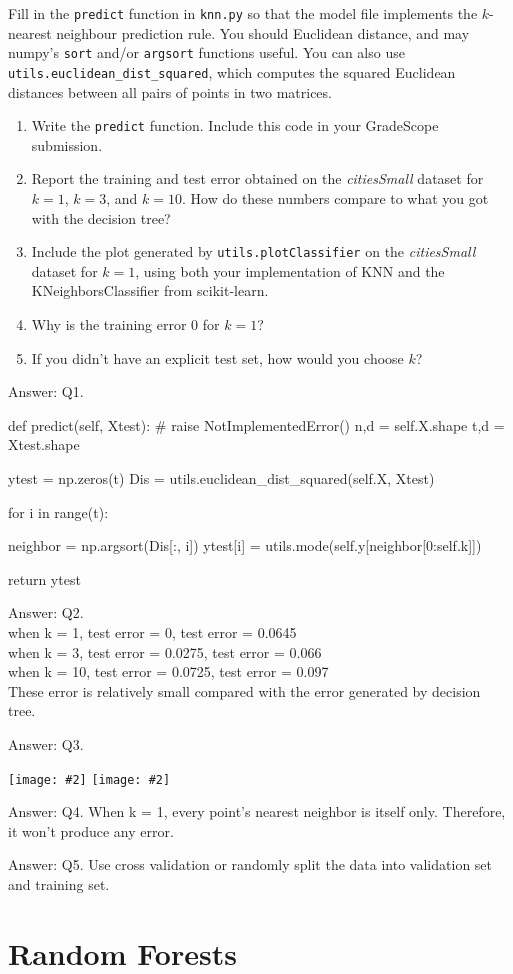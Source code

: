 \documentclass{article}
\def\ans#1{\par\gre{Answer: #1}}
\def\blu#1{{\color{blu}#1}}
\def\gre#1{{\color{gre}#1}}
\newcommand{\fig}[2]{\texttt{[image: \#2]}}
\def\enum#1{\begin{enumerate}#1\end{enumerate}}
\begin{document}
Fill in the \texttt{predict} function in \texttt{knn.py} so that the model file implements the $k$-nearest neighbour prediction rule.
You should Euclidean distance, and may numpy's \texttt{sort} and/or \texttt{argsort} functions useful.
You can also use \texttt{utils.euclidean\string_dist\string_squared}, which computes the squared Euclidean distances between all pairs of points in two matrices.
\blu{
\enum{
\item Write the \texttt{predict} function. Include this code in your GradeScope submission.
\item Report  the training and test error obtained on the \emph{citiesSmall} dataset for $k=1$, $k=3$, and $k=10$. How do these numbers compare to what you got with the decision tree?
\item Include the plot generated by \texttt{utils.plotClassifier} on the \emph{citiesSmall} dataset for $k=1$, using both your implementation of KNN and the KNeighborsClassifier from scikit-learn.
\item Why is the training error $0$ for $k=1$?
\item If you didn't have an explicit test set, how would you choose $k$?
}}
\ans{Q1.}
\begin{python}
	def predict(self, Xtest):
	# raise NotImplementedError()
	n,d = self.X.shape
	t,d = Xtest.shape
	
	ytest = np.zeros(t)
	Dis = utils.euclidean_dist_squared(self.X, Xtest)
	
	
	for i in range(t):
	
	neighbor = np.argsort(Dis[:, i])
	ytest[i] = utils.mode(self.y[neighbor[0:self.k]])
	
	return ytest
\end{python}
\ans{Q2.
\\when k = 1, test error = 0, test error = 0.0645
\\when k = 3, test error = 0.0275, test error = 0.066
\\when k = 10, test error = 0.0725, test error = 0.097
\\These error is relatively small compared with the error generated by decision tree.
}
\ans{Q3.}
\par
\fig{1}{../figs/q3}
\fig{1}{../figs/q3(1)}
\ans{Q4. When k = 1, every point's nearest neighbor is itself only. Therefore, it won't produce any error.}
\ans{Q5. Use cross validation or randomly split the data into validation set and training set.}

\section{Random Forests}
\end{document}
